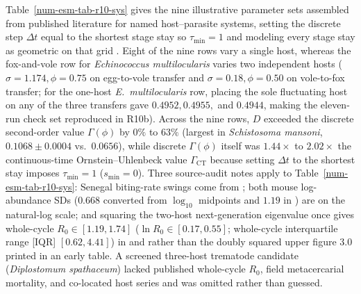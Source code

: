 Table~\ref{num-esm-tab-r10-sys} gives the nine illustrative parameter sets assembled from published literature for named host--parasite systems, setting the discrete step $\Delta t$ equal to the shortest stage stay so $\tau_{\min} = 1$ and modeling every stage stay as geometric on that grid \citep{paterson1998,lewellen1998,milner1999,kao2000,haydon2002,ishikawa2003,elias2004,lambin2006,smith2007,new2009,jacob2011,ndiath2012,atkinson2013,dunn2013,colley2014,martinezpadilla2014,anderson2015,ototo2015,alvarezrojas2018,gurarie2018,rabone2019,anderson2021,tufts2021,whittaker2022}. Eight of the nine rows vary a single host, whereas the fox-and-vole row for \emph{Echinococcus multilocularis} varies two independent hosts ($\sigma = 1.174, \phi = 0.75$ on egg-to-vole transfer and $\sigma = 0.18, \phi = 0.50$ on vole-to-fox transfer; for the one-host \emph{E.~multilocularis} row, placing the sole fluctuating host on any of the three transfers gave $0.4952, 0.4955,$ and $0.4944$, making the eleven-run check set reproduced in R10b). Across the nine rows, $D$ exceeded the discrete second-order value $\Gamma(\phi)$ by $0\%$ to $63\%$ (largest in \emph{Schistosoma mansoni}, $0.1068 \pm 0.0004$ vs.\ $0.0656$), while discrete $\Gamma(\phi)$ itself was $1.44\times$ to $2.02\times$ the continuous-time Ornstein--Uhlenbeck value $\Gamma_{\mathrm{CT}}$ because setting $\Delta t$ to the shortest stay imposes $\tau_{\min} = 1$ ($s_{\min} = 0$). Three source-audit notes apply to Table~\ref{num-esm-tab-r10-sys}: Senegal biting-rate swings come from \citet{ndiath2012}; both mouse log-abundance SDs ($0.668$ converted from $\log_{10}$ midpoints and $1.19$ in \citealp{elias2004}) are on the natural-log scale; and squaring the two-host next-generation eigenvalue once gives whole-cycle $R_0 \in [1.19, 1.74]$ ($\ln R_0 \in [0.17, 0.55]$; whole-cycle interquartile range [IQR] $[0.62, 4.41]$) in \citet{dunn2013} and \citet{tufts2021} rather than the doubly squared upper figure $3.0$ printed in an early table. A screened three-host trematode candidate (\emph{Diplostomum spathaceum}) lacked published whole-cycle $R_0$, field metacercarial mortality, and co-located host series and was omitted rather than guessed.

